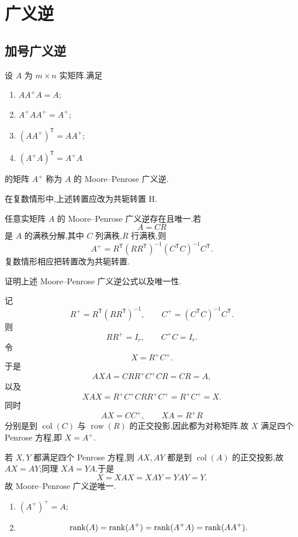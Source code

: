\newpage

\section{广义逆}

\subsection{加号广义逆}

\begin{definition}
设 $A$ 为 $m\times n$ 实矩阵.满足
\begin{enumerate}
  \item $AA^+A=A$;
  \item $A^+AA^+=A^+$;
  \item $(AA^+)^{\mathsf T}=AA^+$;
  \item $(A^+A)^{\mathsf T}=A^+A$
\end{enumerate}
的矩阵 $A^+$ 称为 $A$ 的 Moore--Penrose 广义逆.

在复数情形中,上述转置应改为共轭转置 $\mathrm H$.
\end{definition}

\begin{theorem}[\markstar]
任意实矩阵 $A$ 的 Moore--Penrose 广义逆存在且唯一.若
\[
A=CR
\]
是 $A$ 的满秩分解,其中 $C$ 列满秩,$R$ 行满秩,则
\[
\boxed{
A^+
=R^{\mathsf T}(RR^{\mathsf T})^{-1}(C^{\mathsf T}C)^{-1}C^{\mathsf T}
}.
\]
复数情形相应把转置改为共轭转置.
\end{theorem}

\begin{example}
证明上述 Moore--Penrose 广义逆公式以及唯一性.
\end{example}
\exampleblank

\begin{solution}
记
\[
R^+=R^{\mathsf T}(RR^{\mathsf T})^{-1},
\qquad
C^+=(C^{\mathsf T}C)^{-1}C^{\mathsf T}.
\]
则
\[
RR^+=I_r,
\qquad
C^+C=I_r.
\]
令
\[
X=R^+C^+.
\]
于是
\[
AXA=CRR^+C^+CR=CR=A,
\]
以及
\[
XAX=R^+C^+CRR^+C^+=R^+C^+=X.
\]
同时
\[
AX=CC^+,
\qquad
XA=R^+R
\]
分别是到 $\operatorname{col}(C)$ 与 $\operatorname{row}(R)$ 的正交投影,因此都为对称矩阵.故 $X$ 满足四个 Penrose 方程,即 $X=A^+$.

若 $X,Y$ 都满足四个 Penrose 方程,则 $AX,AY$ 都是到 $\operatorname{col}(A)$ 的正交投影,故 $AX=AY$;同理 $XA=YA$.于是
\[
X=XAX=XAY=YAY=Y.
\]
故 Moore--Penrose 广义逆唯一.
\end{solution}

\begin{proposition}[\markstar]
\leavevmode
\begin{enumerate}
  \item $(A^+)^+=A$;
  \item
  \[
  \operatorname{rank}(A)=\operatorname{rank}(A^+)=\operatorname{rank}(A^+A)=\operatorname{rank}(AA^+).
  \]
\end{enumerate}
\end{proposition}

